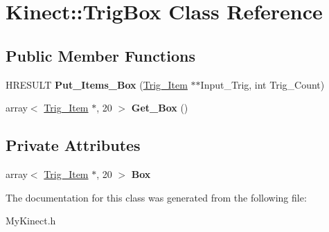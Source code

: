 \hypertarget{class_kinect_1_1_trig_box}{}\section{Kinect\+:\+:Trig\+Box Class Reference}
\label{class_kinect_1_1_trig_box}
\subsection*{Public Member Functions}
\begin{DoxyCompactItemize}
\item 
\mbox{\label{class_kinect_1_1_trig_box_a1c536dc20cbbd5bbddfa4705c3a6e22a}} 
H\+R\+E\+S\+U\+LT {\bfseries Put\+\_\+\+Items\+\_\+\+Box} (\hyperlink{class_kinect_1_1_trig___item}{Trig\+\_\+\+Item} $\ast$$\ast$Input\+\_\+\+Trig, int Trig\+\_\+\+Count)
\item 
\mbox{\label{class_kinect_1_1_trig_box_ad9ecd1b2645c726cb0baf58d51110dba}} 
array$<$ \hyperlink{class_kinect_1_1_trig___item}{Trig\+\_\+\+Item} $\ast$, 20 $>$ {\bfseries Get\+\_\+\+Box} ()
\end{DoxyCompactItemize}
\subsection*{Private Attributes}
\begin{DoxyCompactItemize}
\item 
\mbox{\label{class_kinect_1_1_trig_box_a2bcd02d6caefcfd7ecfbabf9ab71478c}} 
array$<$ \hyperlink{class_kinect_1_1_trig___item}{Trig\+\_\+\+Item} $\ast$, 20 $>$ {\bfseries Box}
\end{DoxyCompactItemize}


The documentation for this class was generated from the following file\+:\begin{DoxyCompactItemize}
\item 
My\+Kinect.\+h\end{DoxyCompactItemize}
